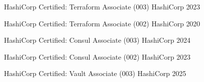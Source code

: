 \begin{cvhonors}
  \cvhonor
    {HashiCorp Certified: Terraform Associate (003)} %
    {HashiCorp} %
    {} %
    {2023} %

  \cvhonor
    {HashiCorp Certified: Terraform Associate (002)} %
    {HashiCorp} %
    {} %
    {2020} %

  \cvhonor
    {HashiCorp Certified: Consul Associate (003)} %
    {HashiCorp} %
    {} %
    {2024} %

  \cvhonor
    {HashiCorp Certified: Consul Associate (002)} %
    {HashiCorp} %
    {} %
    {2023} %

  \cvhonor
    {HashiCorp Certified: Vault Associate (003)} %
    {HashiCorp} %
    {} %
    {2025} %

\end{cvhonors}